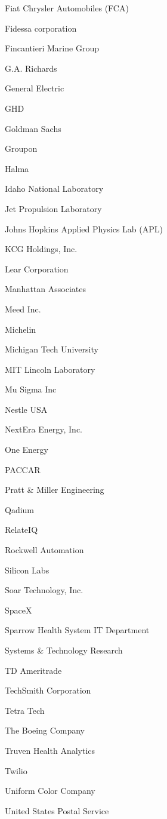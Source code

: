 \documentclass[twoside]{article}
\begin{document}
\begin{center}
\begin{multicols}{5}
\begin{FlushLeft}
\begin{compactitem}
\item Fiat Chrysler Automobiles (FCA)
\item Fidessa corporation
\item Fincantieri Marine Group
\item G.A. Richards
\item General Electric
\item GHD
\item Goldman Sachs
\item Groupon
\item Halma
\item Idaho National Laboratory
\item Jet Propulsion Laboratory
\item Johns Hopkins Applied Physics Lab (APL)
\item KCG Holdings, Inc.
\item Lear Corporation
\item Manhattan Associates
\item Meed Inc.
\item Michelin
\item Michigan Tech University
\item MIT Lincoln Laboratory
\item Mu Sigma Inc
\item Nestle USA
\item NextEra Energy, Inc.
\item One Energy
\item PACCAR
\item Pratt \& Miller Engineering
\item Qadium
\item RelateIQ
\item Rockwell Automation
\item Silicon Labs
\item Soar Technology, Inc.
\item SpaceX
\item Sparrow Health System IT Department
\item Systems \& Technology Research
\item TD Ameritrade
\item TechSmith Corporation
\item Tetra Tech
\item The Boeing Company
\item Truven Health Analytics
\item Twilio
\item Uniform Color Company
\item United States Postal Service

\end{compactitem}
\end{FlushLeft}
\end{multicols}
\end{center}
\end{document}
